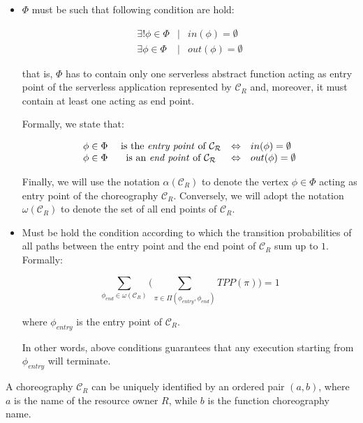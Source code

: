 \documentclass[12pt,a4paper]{report}
\theoremstyle{definition}
\begin{document}
\begin{itemize}
	\item $\Phi$ must be such that following condition are hold:
	
	\begin{eqnarray}
		\exists !  \phi \in \Phi &\mid & in(\phi) = \emptyset \label{cond1} \\
		\exists   \phi \in \Phi & \mid & out(\phi) = \emptyset \label{cond2}
	\end{eqnarray}
	
	that is, $\Phi$ has to contain only one serverless abstract function acting as entry point of the serverless application represented by $\mathcal{C}_R$ and, moreover, it must contain at least one acting as end point. 
	
	Formally, we state that:
	
	\begin{equation}
		\begin{array}{lcll}
			\phi \in \Phi & \text{ is the \textit{entry point} of } \mathcal{C_R} & \Leftrightarrow & in(\phi) = \emptyset \\
			\phi \in \Phi & \text{ is an \textit{end point} of } \mathcal{C_R} & \Leftrightarrow & out(\phi) = \emptyset
		\end{array}
	\end{equation}
	
	Finally, we will use the notation $\alpha(\mathcal{C}_R)$ to denote the vertex $\phi \in \Phi$ acting as entry point of the choreography $\mathcal{C}_R$. Conversely, we will adopt the notation $\omega(\mathcal{C}_R)$ to denote the set of all end points of $\mathcal{C}_R$.
	
	
	\item Must be hold the condition according to which the transition probabilities of all paths between the entry point and	the end point of $\mathcal{C}_R$ sum up to $1$. Formally:
	
	\begin{equation}\label{cond3}
		\sum_{\phi_{end} \in \omega(\mathcal{C}_R)} \Big( \sum_{\pi \in \Pi(\phi_{entry}, \phi_{end})} TPP(\pi) \Big) = 1
	\end{equation}
	
	where $\phi_{entry}$ is the entry point of $\mathcal{C}_R$.
	
	In other words, above conditions guarantees that any execution starting from $\phi_{entry}$ will terminate.
	
\end{itemize} 

A choreography $\mathcal{C}_R$ can be uniquely identified by an ordered pair $(a, b)$, where $a$ is the name of the resource owner $R$, while $b$ is the function choreography name.
\end{document}
